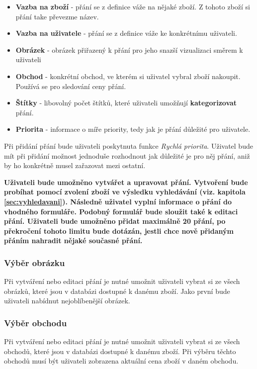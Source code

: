 \begin{itemize}
\item \textbf{Vazba na zboží} - přání se z definice váže na nějaké zboží. Z tohoto zboží si přání take převezme název.
\item \textbf{Vazba na uživatele} - přání se z definice váže ke konkrétnímu uživateli.
\item \textbf{Obrázek} - obrázek přiřazený k přání pro jeho snazší vizualizaci směrem k uživateli
\item \textbf{Obchod} - konkrétní obchod, ve kterém si uživatel vybral zboží nakoupit. Používá se pro sledování ceny přání.
\item \textbf{Štítky} - libovolný počet štítků, které uživateli umožňují \textbf{kategorizovat} přání.
\item \textbf{Priorita} - informace o míře priority, tedy jak je přání důležité pro uživatele.
\end{itemize}

Při přidání přání bude uživateli poskytnuta funkce \emph{Rychlá priorita}. Uživatel bude mít při přidání možnost jednoduše rozhodnout jak důležité je pro něj přání, aniž by ho konkrétně musel zařazovat mezi ostatní.

\textbf{Uživateli bude umožněno vytvářet a upravovat přání. Vytvoření bude probíhat pomocí zvolení zboží ve výsledku vyhledávání (viz. kapitola \ref{sec:vyhledavani}). Následně uživatel vyplní informace o přání do vhodného formuláře. Podobný formulář bude sloužit také k editaci přání. Uživateli bude umožněno přidat maximálně 20 přání, po překročení tohoto limitu bude dotázán, jestli chce nově přidaným přáním nahradit nějaké současné přání.}

\subsubsection{Výběr obrázku}
Při vytváření nebo editaci přání je nutné umožnit uživateli vybrat si ze všech obrázků, které jsou v databázi dostupné k danému zboží. Jako první bude uživateli nabídnut nejoblíbenější obrázek.

\subsubsection{Výběr obchodu}
Při vytváření nebo editaci přání je nutné umožnit uživateli vybrat si ze všech obchodů, které jsou v databázi dostupné k danému zboží. Při výběru těchto obchodů musí být uživateli zobrazena aktuální cena zboží v daném obchodu.

